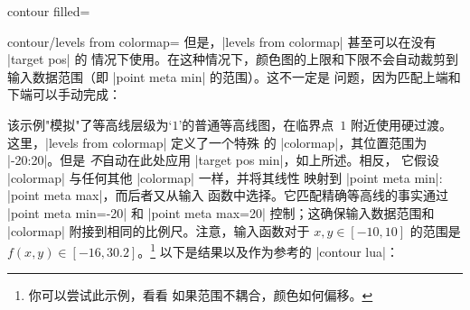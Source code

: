 {{\begin{plottype}[/pgfplots]{
    contour filled=\textcolor{black}{}%
}
\begin{pgfplotskey}{contour/levels from colormap=}
        但是，|levels from colormap| 甚至可以在没有 |target pos| 的
        情况下使用。在这种情况下，颜色图的上限和下限不会自动裁剪到
        输入数据范围（即 |point meta min| 的范围）。这不一定是
        问题，因为匹配上端和下端可以手动完成：
\pgfplotsexpensiveexample
\begin{codeexample}[]
\end{codeexample}
        该示例"模拟"了等高线层级为`$1$'的普通等高线图，在临界点~$1$
        附近使用硬过渡。这里，|levels from colormap| 定义了一个特殊
        的 |colormap|，其位置范围为 |-20:20|。但是 \PGFPlots{}
        \emph{不}自动在此处应用 |target pos min|，如上所述。相反，
        它假设 |colormap| 与任何其他 |colormap| 一样，并将其线性
        映射到 |point meta min|$:$|point meta max|，而后者又从输入
        函数中选择。它匹配精确等高线的事实通过 |point meta min=-20|
        和 |point meta max=20| 控制；这确保输入数据范围和
        |colormap| 附接到相同的比例尺。注意，输入函数对于
        $x,y \in [-10,10]$ 的范围是
        $f(x,y) \in [-16,30.2]$。\footnote{你可以尝试此示例，看看
        如果范围不耦合，颜色如何偏移。} 以下是结果以及作为参考的
        |contour lua|：
\pgfplotsexpensiveexample
\begin{codeexample}[]
\end{codeexample}
    \end{pgfplotskey}


\end{plottype}}}
